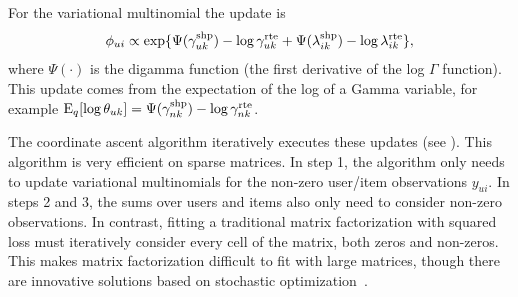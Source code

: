 \documentclass{sig-alternate}
\begin{document}
For the variational multinomial the update is
\begin{equation}
  \phi_{ui} \propto \exp\{\Psi(\gamma_{uk}^{\textrm{shp}}) - \log
  \gamma_{uk}^{\textrm{rte}} + \Psi(\lambda_{ik}^{\textrm{shp}}) - \log
  \lambda_{ik}^{\textrm{rte}}\},
\end{equation}
where $\Psi(\cdot)$ is the digamma function (the first derivative of
the log $\Gamma$ function).  This update comes from the expectation of
the log of a Gamma variable, for example $\textrm{E}_q[\log \theta_{uk}] =
\Psi(\gamma_{nk}^{\textrm{shp}}) - \log \gamma_{nk}^{\textrm{rte}}$.

The coordinate ascent algorithm iteratively executes these updates
(see ).  This algorithm is very efficient on sparse
matrices. In step 1, the algorithm only needs to update variational
multinomials for the non-zero user/item observations $y_{ui}$.  In
steps 2 and 3, the sums over users and items also only need to
consider non-zero observations.  In contrast, fitting a traditional
matrix factorization with squared loss must iteratively consider every
cell of the matrix, both zeros and non-zeros. This makes matrix
factorization difficult to fit with large matrices, though there are
innovative solutions based on stochastic
optimization~\cite{Mairal:2010}.

\end{document}
